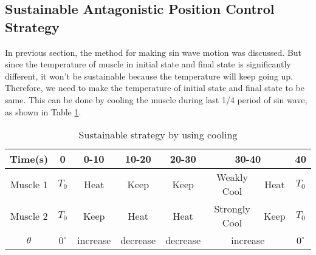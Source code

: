 


\subsection{Sustainable Antagonistic Position Control Strategy}\label{section_simulation}
In previous section, the method for making sin wave motion was discussed. But since the temperature of muscle in initial state and final state is significantly different, it won't be sustainable because the temperature will keep going up. Therefore, we need to make the temperature of initial state and final state to be same. This can be done by cooling the muscle during last 1/4 period of sin wave, as shown in Table \ref{table_apc_sustain}.

\begin{table}[b]
	\caption{Sustainable \apc strategy by using cooling}
	\label{table_apc_sustain}
	\begin{center}
		\begin{tabular}{c||c|c|c|c|c|c|c}
			\hline
			Time(s) & 0 & 0-10 & 10-20 & 20-30 & \multicolumn{2}{|c|}{30-40} & 40 \\
			\hline
			Muscle 1 & $T_0$ & Heat & Keep & Keep & Weakly Cool & Heat & $T_0$ \\
			Muscle 2 & $T_0$ & Keep & Heat & Heat & Strongly Cool & Keep & $T_0$ \\
			\hline
			$\theta$ & $0^{\circ}$ & increase & decrease & decrease & \multicolumn{2}{|c|}{increase} & $0^{\circ}$ \\
			\hline
		\end{tabular}
	\end{center}
\end{table}

